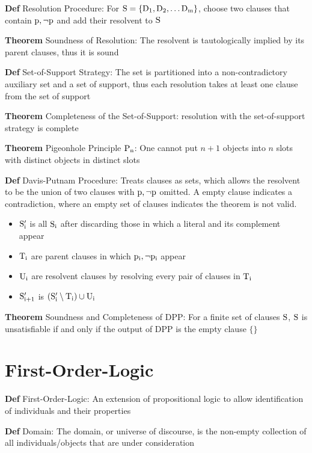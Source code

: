 \documentclass[11pt,notitlepage]{report}
\newcommand{\tbf}[1]{\textbf{#1}}
\begin{document}
\tbf{Def} Resolution Procedure: For $\rm S = \{\rm D_1, D_2, \dots D_m\}$, choose two clauses that contain $\rm p, \neg \rm p$ and add their resolvent to $\rm S$

\tbf{Theorem} Soundness of Resolution: The resolvent is tautologically implied by its parent clauses, thus it is sound

\tbf{Def} Set-of-Support Strategy: The set is partitioned into a non-contradictory auxiliary set and a set of support, thus each resolution takes at least one clause from the set of support

\tbf{Theorem} Completeness of the Set-of-Support: resolution with the set-of-support strategy is complete

\tbf{Theorem} Pigeonhole Principle $\rm P_n$: One cannot put $n+1$ objects into $n$ slots with distinct objects in distinct slots

\tbf{Def} Davis-Putnam Procedure: Treats clauses as sets, which allows the resolvent to be the union of two clauses with $\rm p, \neg \rm p$ omitted. A empty clause indicates a contradiction, where an empty set of clauses indicates the theorem is not valid.
\begin{itemize}
    \item $\rm S_i'$ is all $\rm S_i$ after discarding those in which a literal and its complement appear
    \item $\rm T_i$ are parent clauses in which $\rm p_i, \neg \rm p_i$ appear
    \item $\rm U_i$ are resolvent clauses by resolving every pair of clauses in $\rm T_i$
    \item $\rm S_{i+1}'$ is $(\rm S_i' \setminus \rm T_i) \cup \rm U_i$
\end{itemize}

\tbf{Theorem} Soundness and Completeness of DPP: For a finite set of clauses $\rm S$, $\rm S$ is unsatisfiable if and only if the output of DPP is the empty clause $\{\}$

\newpage
\setcounter{section}{9}
\section{First-Order-Logic}

\tbf{Def} First-Order-Logic: An extension of propositional logic to allow identification of individuals and their properties

\tbf{Def} Domain: The domain, or universe of discourse, is the non-empty collection of all individuals/objects that are under consideration
\end{document}
